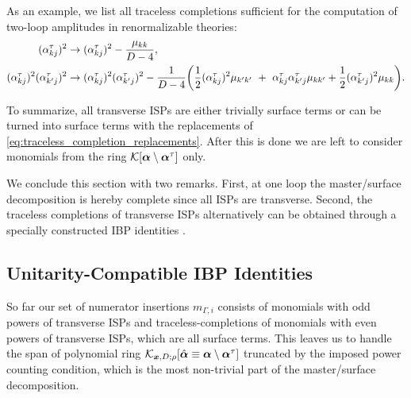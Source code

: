 As an example, we list all traceless completions sufficient for the computation of two-loop amplitudes in renormalizable theories:
\begin{align} \label{eq:traceless_completion_replacements}
  (\alpha_{kj}^{\tau})^2 &\to (\alpha_{kj}^{\tau})^2 - \frac{\mu_{kk}}{D-4}, \\
  \nonumber
  (\alpha_{kj}^{\tau})^2(\alpha_{k^\prime j}^{\tau})^2 &\to
  (\alpha_{kj}^{\tau})^2(\alpha_{k^\prime j}^{\tau})^2 - \frac{1}{D-4} \qty(
    \frac{1}{2}(\alpha_{kj}^{\tau})^2 \mu_{k^\prime k^\prime} ~+~ \alpha_{kj}^{\tau}\alpha_{k^\prime j}^{\tau} \mu_{k k^\prime} + \frac{1}{2}(\alpha_{k^\prime j}^{\tau})^2 \mu_{k k}
  ).
\end{align}

To summarize, all transverse ISPs are either trivially surface terms or can be turned into surface terms with the replacements of \cref{eq:traceless_completion_replacements}.
After this is done we are left to consider monomials from the ring $\mathcal{K}[\vb*{\alpha}\setminus\vb*{\alpha}^\tau]$ only.


We conclude this section with two remarks.
First, at one loop the master/surface decomposition is hereby complete since all ISPs are transverse.
Second, the traceless completions of transverse ISPs alternatively
can be obtained through a specially constructed IBP identities \cite{Ita:2015tya}.



\subsection{Unitarity-Compatible IBP Identities}
So far our set of numerator insertions $m_{\Gamma,i}$ consists of monomials with odd powers of transverse ISPs and traceless-completions of
monomials with even powers of transverse ISPs, which are all surface terms.
This leaves us to handle the span of polynomial ring $\mathcal{K}_{\vb*{x},D;\rho}[\hat{\vb*{\alpha}}\equiv \vb*{\alpha}\setminus\vb*{\alpha}^\tau]$ truncated by the imposed
power counting condition,
which is the most non-trivial part of the master/surface decomposition.

